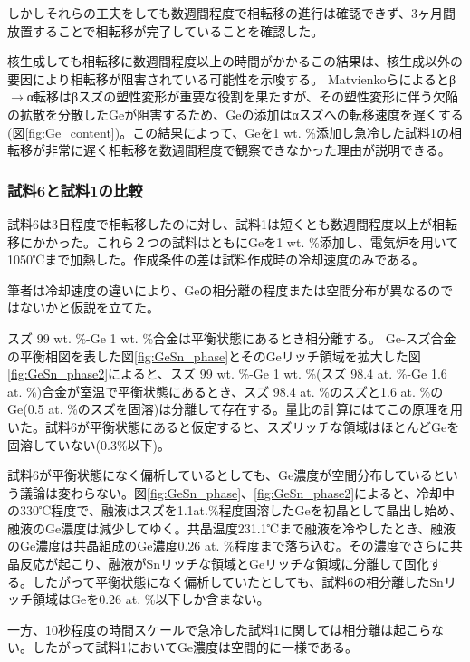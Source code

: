 しかしそれらの工夫をしても数週間程度で相転移の進行は確認できず、3ヶ月間放置することで相転移が完了していることを確認した。

核生成しても相転移に数週間程度以上の時間がかかるこの結果は、核生成以外の要因により相転移が阻害されている可能性を示唆する。
Matvienkoら\cite{Matvienko}によるとβ$\to$α転移はβスズの塑性変形が重要な役割を果たすが、その塑性変形に伴う欠陥の拡散を分散したGeが阻害するため、Geの添加はαスズへの転移速度を遅くする(図\ref{fig:Ge_content})。この結果によって、Geを1 wt. \%添加し急冷した試料1の相転移が非常に遅く相転移を数週間程度で観察できなかった理由が説明できる。

\subsubsection{試料6と試料1の比較}
試料6は3日程度で相転移したのに対し、試料1は短くとも数週間程度以上が相転移にかかった。これら２つの試料はともにGeを1 wt. \%添加し、電気炉を用いて1050℃まで加熱した。作成条件の差は試料作成時の冷却速度のみである。

筆者は冷却速度の違いにより、Geの相分離の程度または空間分布が異なるのではないかと仮説を立てた。

スズ 99 wt. \%-Ge 1 wt. \%合金は平衡状態にあるとき相分離する。
Ge-スズ合金の平衡相図を表した図\ref{fig:GeSn_phase}とそのGeリッチ領域を拡大した図\ref{fig:GeSn_phase2}によると、スズ 99 wt. \%-Ge 1 wt. \%(スズ 98.4 at. \%-Ge 1.6 at. \%)合金が室温で平衡状態にあるとき、スズ 98.4 at. \%のスズと1.6 at. \%のGe(0.5 at. \%のスズを固溶)は分離して存在する。量比の計算にはてこの原理を用いた。試料6が平衡状態にあると仮定すると、スズリッチな領域はほとんどGeを固溶していない(0.3\%以下\cite{Thurmond1960})。

試料6が平衡状態になく偏析しているとしても、Ge濃度が空間分布しているという議論は変わらない。図\ref{fig:GeSn_phase}、\ref{fig:GeSn_phase2}によると、冷却中の330℃程度で、融液はスズを1.1at.\%程度固溶したGeを初晶として晶出し始め、融液のGe濃度は減少してゆく。共晶温度231.1℃まで融液を冷やしたとき、融液のGe濃度は共晶組成のGe濃度0.26 at. \%程度\cite{Thurmond1960}まで落ち込む。その濃度でさらに共晶反応が起こり、融液がSnリッチな領域とGeリッチな領域に分離して固化する。したがって平衡状態になく偏析していたとしても、試料6の相分離したSnリッチ領域はGeを0.26 at. \%以下しか含まない。

一方、10秒程度の時間スケールで急冷した試料1に関しては相分離は起こらない。したがって試料1においてGe濃度は空間的に一様である。%


